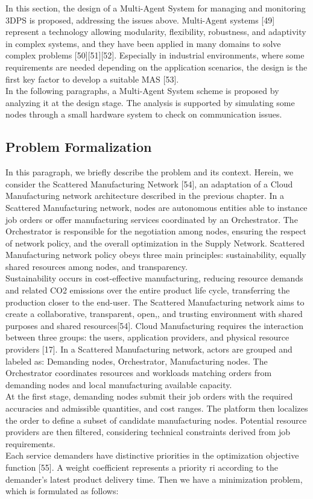 In this section, the design of a Multi-Agent System for managing and monitoring 3DPS is proposed, addressing the issues above. Multi-Agent systems [49] represent a technology allowing modularity, flexibility, robustness, and adaptivity in complex systems, and they have been applied in many domains to solve complex problems [50][51][52]. Especially in industrial environments, where some requirements are needed depending on the application scenarios, the design is the first key factor to develop a suitable MAS [53].\\
In the following paragraphs, a Multi-Agent System scheme is proposed by analyzing it at the design stage. The analysis is supported by simulating some nodes through a small hardware system to check on communication issues.
\subsection{Problem Formalization}
In this paragraph, we briefly describe the problem and its context. Herein, we consider the Scattered Manufacturing Network [54], an adaptation of a Cloud Manufacturing network architecture described in the previous chapter. In a Scattered Manufacturing network, nodes are autonomous entities able to instance job orders or offer manufacturing services coordinated by an Orchestrator. The Orchestrator is responsible for the negotiation among nodes, ensuring the respect of network policy, and the overall optimization in the Supply Network. Scattered Manufacturing network policy obeys three main principles: sustainability, equally shared resources among nodes, and transparency.\\
Sustainability occurs in cost-effective manufacturing, reducing resource demands and related CO2 emissions over the entire product life cycle, transferring the production closer to the end-user. The Scattered Manufacturing network aims to create a collaborative, transparent, open,, and trusting environment with shared purposes and shared resources[54]. Cloud Manufacturing requires the interaction between three groups: the users, application providers, and physical resource providers [17]. In a Scattered Manufacturing network, actors are grouped and labeled as: Demanding nodes, Orchestrator, Manufacturing nodes. The Orchestrator coordinates resources and workloads matching orders from demanding nodes and local manufacturing available capacity.\\
At the first stage, demanding nodes submit their job orders with the required accuracies and admissible quantities, and cost ranges. The platform then localizes the order to define a subset of candidate manufacturing nodes. Potential resource providers are then filtered, considering technical constraints derived from job requirements.\\
Each service demanders have distinctive priorities in the optimization objective function [55]. A weight coefficient represents a priority ri according to the demander’s latest product delivery time. Then we have a minimization problem, which is formulated as follows:\\

